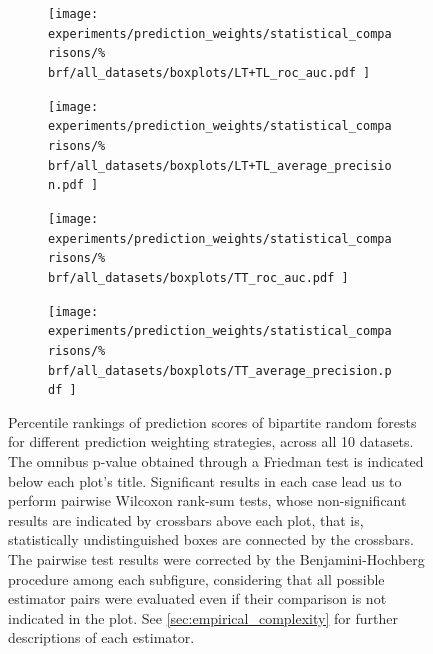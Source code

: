 \begin{figure}[tbh]
    \centering
    \begin{subfigure}{0.49\textwidth}
        \texttt{[image: 
            experiments/prediction\_weights/statistical\_comparisons/\%
            brf/all\_datasets/boxplots/LT+TL\_roc\_auc.pdf
        ]}
    \end{subfigure}
    \begin{subfigure}{0.49\textwidth}
        \texttt{[image: 
            experiments/prediction\_weights/statistical\_comparisons/\%
            brf/all\_datasets/boxplots/LT+TL\_average\_precision.pdf
        ]}
    \end{subfigure}

    \begin{subfigure}{0.49\textwidth}
        \texttt{[image: 
            experiments/prediction\_weights/statistical\_comparisons/\%
            brf/all\_datasets/boxplots/TT\_roc\_auc.pdf
        ]}
    \end{subfigure}
    \begin{subfigure}{0.49\textwidth}
        \texttt{[image: 
            experiments/prediction\_weights/statistical\_comparisons/\%
            brf/all\_datasets/boxplots/TT\_average\_precision.pdf
        ]}
    \end{subfigure}
    \caption{
        Percentile rankings of prediction scores of bipartite random forests for different prediction weighting strategies, across all 10 datasets.
        The omnibus p-value obtained through a Friedman test is indicated below each plot's title. Significant results in each case lead us to perform pairwise Wilcoxon rank-sum tests, whose non-significant results are indicated by crossbars above each plot, that is, statistically undistinguished boxes are connected by the crossbars. The pairwise test results were corrected by the Benjamini-Hochberg procedure among each subfigure, considering that all possible estimator pairs were evaluated even if their comparison is not indicated in the plot. See \autoref{sec:empirical_complexity} for further descriptions of each estimator.
    }
    \label{fig:pred_weights_brf}
\end{figure}


